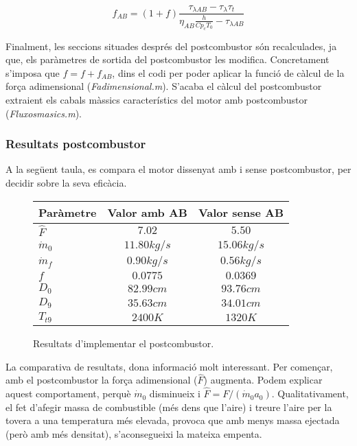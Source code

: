 \begin{equation}
	f_{AB}=(1+f)\frac{\tau_{\lambda AB}-\tau_{\lambda}\tau_t}{\eta_{AB}\frac{h}{Cp_cT_0}-\tau_{\lambda AB}}
\end{equation}
 
 
\noindent Finalment, les seccions situades després del postcombustor són recalculades, ja que, els paràmetres de sortida del postcombustor les modifica. Concretament s'imposa que $f = f +f_{AB}$, dins el codi per poder aplicar la funció de càlcul de la força adimensional (\textit{Fadimensional.m}). S'acaba el càlcul del postcombustor extraient els cabals màssics característics del motor amb postcombustor (\textit{Fluxosmasics.m}).

\subsubsection{Resultats postcombustor}
A la següent taula, es compara el motor dissenyat amb i sense postcombustor, per decidir sobre la seva eficàcia.
\begin{figure}[H]
	\centering
	\begin{tabular}{lcc}
		\toprule[3pt]
		\textbf{Paràmetre}&\textbf{Valor amb AB}&\textbf{Valor sense AB}\\
		\midrule[1pt]
		$\hat{F}$ & $7.02$ & $5.50$\\
		$ \dot{m}_0$ & $11.80kg/s$ & $15.06kg/s$\\
		$ \dot{m}_f$ & $0.90kg/s$ & $0.56kg/s$\\
		$ f$ & $0.0775$ & $0.0369$\\
		$D_0$ & $82.99cm$ & $93.76cm$\\
		$D_9$ & $35.63cm$ & $34.01cm$\\
		$T_{t9}$ & $2400K$ & $1320K$\\
		
		\bottomrule[2pt]
	\end{tabular}
	\label{ABres}
	\caption{Resultats d'implementar el postcombustor.}
\end{figure}

\noindent La comparativa de resultats, dona informació molt interessant. Per començar, amb el postcombustor la força adimensional ($\hat{F}$)  augmenta. Podem explicar aquest comportament, perquè $ \dot{m}_0$ disminueix i $\hat{F}=F/(\dot{m}_0a_0)$. Qualitativament, el fet d'afegir massa de combustible (més dens que l'aire) i treure l'aire per la tovera a una temperatura més elevada, provoca que amb menys massa ejectada (però amb més densitat), s'aconsegueixi la mateixa empenta.

